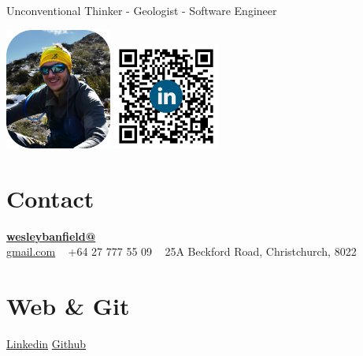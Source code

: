 \documentclass[]{friggeri-cv}
\begin{document}
      {\hspace{5.05cm}Unconventional Thinker - Geologist - Software Engineer}
      

\begin{aside}
  \includegraphics[width=3.5cm]{img/profile_relaxed.png}
  \includegraphics[width=3.5cm]{img/QR.png}
  \section{Contact}
    \href{mailto:wesleybanfield@gmail.com}{\textbf{wesleybanfield@}\\gmail.com}
    ~
    +64 27 777 55 09
    ~
    25A Beckford Road,
    Christchurch, 8022
  \section{Web \& Git}
    \href{https://www.linkedin.com/in/wesleybanfield/}{Linkedin}
    \href{https://github.com/WesleyTheGeolien}{Github}

\end{aside}
\end{document}
